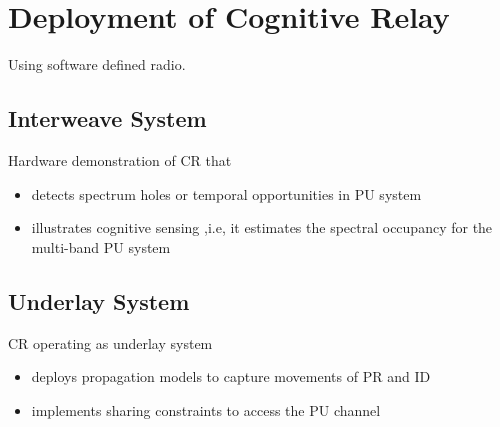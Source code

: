 \chapter{Deployment of Cognitive Relay}
\label{chap:Deploy}
Using software defined radio.
\section{Interweave System}
Hardware demonstration \cite{Kaushik_ISWCS} of \ac{CR} that
\begin{itemize}
\item detects spectrum holes or temporal opportunities in \ac{PU} system 
\item illustrates cognitive sensing ,i.e, it estimates the spectral occupancy for the multi-band \ac{PU} system
\end{itemize}
\section{Underlay System}
\ac{CR} operating as underlay system \cite{Kaushik_CROWNCOM}
\begin{itemize}
\item deploys propagation models to capture movements of \ac{PR} and \ac{ID}
\item implements sharing constraints to access the \ac{PU} channel 
\end{itemize}

